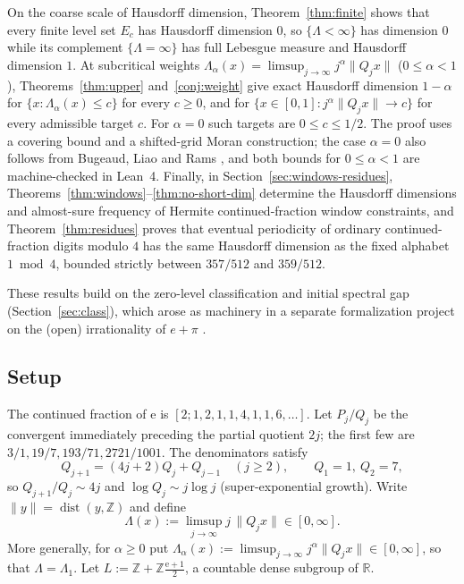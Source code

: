 \documentclass[11pt]{article}
\theoremstyle{definition}
\theoremstyle{remark}
\newcommand{\R}{\mathbb{R}}
\newcommand{\Z}{\mathbb{Z}}
\newcommand{\ee}{\mathrm{e}}
\newcommand{\dist}{\operatorname{dist}}
\newcommand{\Lam}{\Lambda}
\begin{document}
On the coarse scale of Hausdorff dimension, Theorem~\ref{thm:finite} shows that
every finite level set $E_c$ has Hausdorff dimension $0$, so $\{\Lam<\infty\}$
has dimension $0$ while its complement $\{\Lam=\infty\}$ has full Lebesgue
measure and Hausdorff dimension $1$. At subcritical weights
$\Lam_\alpha(x)=\limsup_{j\to\infty}j^\alpha\|Q_jx\|$ ($0\le\alpha<1$),
Theorems~\ref{thm:upper} and~\ref{conj:weight} give exact Hausdorff dimension $1-\alpha$ for
$\{x:\Lam_\alpha(x)\le c\}$ for every $c\ge0$, and for
$\{x\in[0,1]:j^\alpha\|Q_jx\|\to c\}$ for every admissible target $c$.
For $\alpha=0$ such targets are $0\le c\le 1/2$.
The proof uses a covering bound and a shifted-grid Moran construction;
the case $\alpha=0$ also follows from Bugeaud, Liao and Rams \cite{BLR}, and
both bounds for $0\le\alpha<1$ are machine-checked in Lean~4. Finally, in
Section~\ref{sec:windows-residues}, Theorems~\ref{thm:windows}--\ref{thm:no-short-dim}
determine the Hausdorff dimensions and almost-sure frequency of Hermite
continued-fraction window constraints, and Theorem~\ref{thm:residues} proves
that eventual periodicity of ordinary continued-fraction digits modulo $4$ has
the same Hausdorff dimension as the fixed alphabet $1\bmod 4$, bounded strictly
between $357/512$ and $359/512$.

These results build on the zero-level classification and initial spectral gap
(Section~\ref{sec:class}), which arose as machinery in a separate formalization
project on the (open) irrationality of $e+\pi$ \cite{Phase1}.

\subsection{Setup}

The continued fraction of $\ee$ is $[2;1,2,1,1,4,1,1,6,\dots]$. Let $P_j/Q_j$
be the convergent immediately preceding the partial quotient $2j$; the first
few are $3/1,19/7,193/71,2721/1001$. The denominators satisfy
\begin{equation}\label{eq:rec}
Q_{j+1}=(4j+2)Q_j+Q_{j-1}\quad(j\ge2),\qquad Q_1=1,\ Q_2=7,
\end{equation}
so $Q_{j+1}/Q_j\sim 4j$ and $\log Q_j\sim j\log j$ (super-exponential growth).
Write $\|y\|=\dist(y,\Z)$ and define
\[
\Lam(x):=\limsup_{j\to\infty} j\,\|Q_j x\|\in[0,\infty].
\]
More generally, for $\alpha\ge0$ put
$\Lam_\alpha(x):=\limsup_{j\to\infty} j^\alpha\|Q_j x\|\in[0,\infty]$,
so that $\Lam=\Lam_1$.
Let $L:=\Z+\Z\frac{\ee+1}{2}$, a countable dense subgroup of $\R$.
\end{document}
